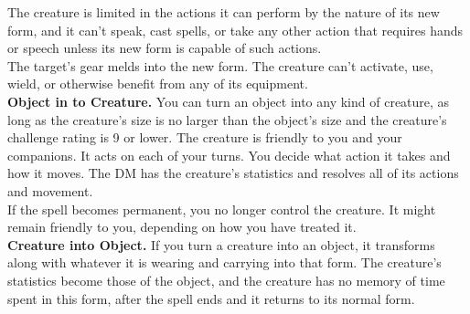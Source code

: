 \documentclass[11pt, A4paper, english]{article}
\begin{document}
The creature is limited in the actions it can perform by the nature of its new form, and it can’t speak, cast spells, or take any other action that requires hands or speech unless its new form is capable of such actions. \\
The target’s gear melds into the new form. The creature can’t activate, use, wield, or otherwise benefit from any of its equipment. \\
\textbf{Object in to Creature.} You can turn an object into any kind of creature, as long as the creature’s size is no larger than the object’s size and the creature’s challenge rating is 9 or lower. The creature is friendly to you and your companions. It acts on each of your turns. You decide what action it takes and how it moves. The DM has the creature’s statistics and resolves all of its actions and movement. \\
If the spell becomes permanent, you no longer control the creature. It might remain friendly to you, depending on how you have treated it. \\
\textbf{Creature into Object.} If you turn a creature into an object, it transforms along with whatever it is wearing and carrying into that form. The creature’s statistics become those of the object, and the creature has no memory of time spent in this form, after the spell ends and it returns to its normal form.
\end{document}
